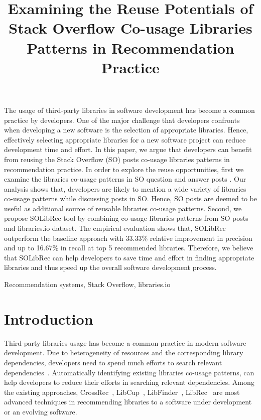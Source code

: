 \documentclass[paper]{ieice}
\title{Examining the Reuse Potentials of Stack Overflow Co-usage Libraries Patterns in Recommendation Practice}
\begin{document}
\maketitle
\begin{summary}

\noindent The usage of third-party libraries in software development has become a common practice by developers. One of the major challenge that developers confronts when developing a new software is the selection of appropriate libraries. Hence, effectively selecting appropriate libraries for a new software project can reduce development time and effort. In this paper, we argue that developers can benefit from reusing the Stack Overflow (SO) posts co-usage libraries patterns in recommendation practice.
In order to explore the reuse opportunities, first we examine the libraries co-usage patterns in SO question and answer posts . Our analysis shows that, developers are likely to mention a wide variety of libraries co-usage patterns while discussing posts in SO. Hence, SO posts are deemed to be useful as additional source of reusable libraries co-usage patterns. Second, we propose SOLibRec tool by combining co-usage libraries patterns from SO posts and libraries.io dataset. The empirical evaluation shows that, SOLibRec outperform the baseline approach with 33.33\% relative improvement in precision and up to 16.67\% in recall at top 5 recommended libraries. Therefore, we believe that SOLibRec can help developers to save time and effort in finding appropriate libraries and thus speed up the overall software development process.
\end{summary}
\begin{keywords}
Recommendation systems, Stack Overflow, libraries.io
\end{keywords}

\section{Introduction}
Third-party libraries usage has become a common practice in modern software development. Due to heterogeneity of resources and the corresponding library dependencies, developers need to spend much efforts to search relevant dependencies~\cite{robillard2009recommendation}. Automatically identifying existing libraries co-usage patterns, can help developers to reduce their efforts in searching relevant dependencies. Among the existing approaches, CrossRec~\cite{nguyen2020crossrec}, LibCup~\cite{saied2018improving}, LibFinder~\cite{ouni2017search}, LibRec~\cite{thung2013automated} are most advanced techniques in recommending libraries to a software under development or an evolving software. 
\end{document}
